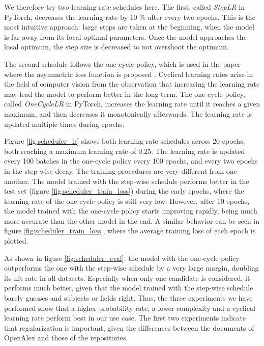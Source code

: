 We therefore try two learning rate schedules here. The first, called \textit{StepLR} in PyTorch, decreases the learning rate by 10 \% after every two epochs. This is the most intuitive approach: large steps are taken at the beginning, when the model is far away from its local optimal parameters. Once the model approaches the local optimum, the step size is decreased to not overshoot the optimum.

The second schedule follows the one-cycle policy, which is used in the paper where the asymmetric loss function is proposed \cite{ben2020asymmetric}. Cyclical learning rates \cite{smith2017cyclical} arise in the field of computer vision from the observation that increasing the learning rate may lead the model to perform better in the long term. The one-cycle policy, called \textit{OneCycleLR} in PyTorch, increases the learning rate until it reaches a given maximum, and then decreases it monotonically afterwards. The learning rate is updated multiple times during epochs.

Figure \ref{fig:scheduler_lr} shows both learning rate schedules across 20 epochs, both reaching a maximum learning rate of 0.25. The learning rate is updated every 100 batches in the one-cycle policy every 100 epochs, and every two epochs in the step-wise decay. The training procedures are very different from one another. The model trained with the step-wise schedule performs better in the test set (figure \ref{fig:scheduler_train_loss}) during the early epochs, where the learning rate of the one-cycle policy is still very low. However, after 10 epochs, the model trained with the one-cycle policy starts improving rapidly, being much more accurate than the other model in the end. A similar behavior can be seen in figure \ref{fig:scheduler_train_loss}, where the average training loss of each epoch is plotted.

As shown in figure \ref{fig:scheduler_eval}, the model with the one-cycle policy outperforms the one with the step-wise schedule by a very large margin, doubling its hit rate in all datasets. Especially when only one candidate is considered, it performs much better, given that the model trained with the step-wise schedule barely guesses and subjects or fields right. Thus, the three experiments we have performed show that a higher probability rate, a lower complexity and a cyclical learning rate perform best in our use case. The first two experiments indicate that regularization is important, given the differences between the documents of OpenAlex and those of the repositories.
